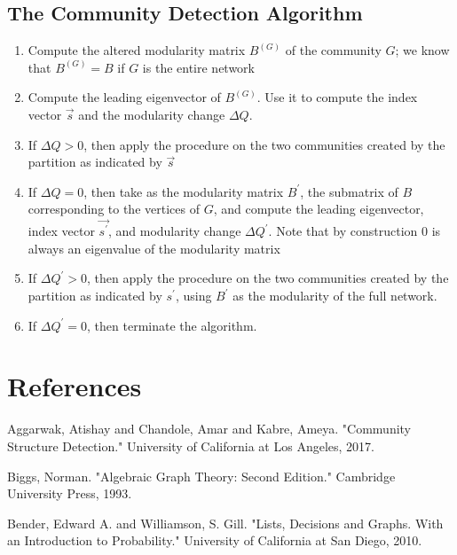 \documentclass{article}
\begin{document}
\subsection{The Community Detection Algorithm}

\begin{enumerate}
  \item Compute the altered modularity matrix $B^{(G)}$ of the community $G$; we know that $B^{(G)} = B$ if $G$ is the entire network
  \item Compute the leading eigenvector of $B^{(G)}$. Use it to compute the index vector $\vec{s}$ and the modularity change $\Delta Q$.
  \item If $\Delta Q > 0$, then apply the procedure on the two communities created by the partition as indicated by $\vec{s}$
  \item If $\Delta Q = 0$, then take as the modularity matrix $B^\prime$, the submatrix of $B$ corresponding to the vertices of $G$, and compute the leading
        eigenvector, index vector $\vec{s^\prime}$, and modularity change $\Delta Q^{\prime}$. Note that by construction 0 is always an eigenvalue of the modularity matrix  
  \item If $\Delta Q^{\prime} > 0$, then apply the procedure on the two communities created by the partition as indicated by $s^\prime$, using $B^\prime$ as the modularity of the full network.
  \item If $\Delta Q^{\prime} = 0$, then terminate the algorithm.
\end{enumerate}

\pagebreak
\section{References}

\bigskip

\noindent Aggarwak, Atishay and Chandole, Amar and Kabre, Ameya. "Community Structure Detection." University of California at Los Angeles, 2017.

\bigskip

\noindent Biggs, Norman. "Algebraic Graph Theory: Second Edition." Cambridge University Press, 1993.

\bigskip 

\noindent Bender, Edward A. and Williamson, S. Gill. "Lists, Decisions and Graphs. With an Introduction to Probability." University of California at San Diego, 2010.

\bigskip 
\end{document}
